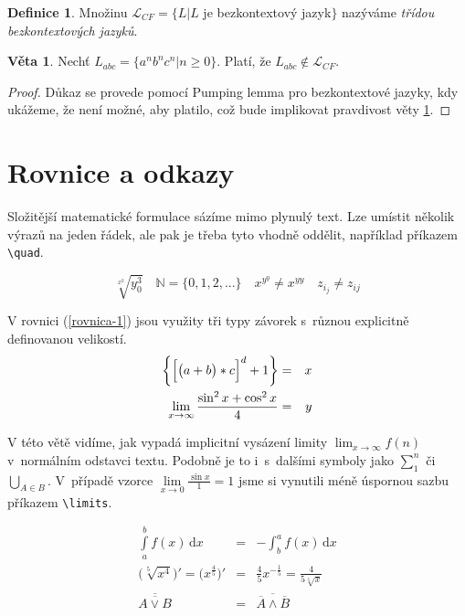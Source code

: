 \documentclass[11pt, a4paper, twocolumn, titlepage] {article}
\theoremstyle{definition}
\newtheorem{definition}{Definice}[section]
\newtheorem{veta}{Věta}
\begin{document}
\begin{definition}
Množinu $\mathcal{L}_{CF} = \{L|L$ je bezkontextový jazyk$\}$ nazýváme \emph{třídou bezkontextových jazyků}.
\end{definition}

\begin{veta} \label{veta-1}
Nechť $L_{abc} = \{ a^nb^nc^n|n \geq 0 \}$. Platí, že $L_{abc} \notin \mathcal{L}_{CF}$.
\end{veta}

\begin{proof}
Důkaz se provede pomocí Pumping lemma pro bezkontextové jazyky, kdy ukážeme, že není možné, aby platilo, což bude implikovat pravdivost věty \ref{veta-1}.
\end{proof}

\section{Rovnice a odkazy}
Složitější matematické formulace sázíme mimo plynulý text. Lze umístit několik výrazů na jeden řádek, ale pak je třeba tyto vhodně oddělit, například příkazem \verb|\quad|.

$$\sqrt[x^2]{y^3_0} \quad \mathbb{N} = \{0,1,2,...\} \quad x^{y^y} \neq x^{yy} \quad z_{i_j} \neq z_{ij}$$

V rovnici (\ref{rovnica-1}) jsou využity tři typy závorek s~různou explicitně definovanou velikostí.
\begin{eqnarray} 
\bigg{\{} \Big[ \big(a + b \big) * c \Big]^d + 1\bigg{\}} &= &x \label{rovnica-1}\\
\lim_{x\to\infty}\frac{\sin^2 x + \cos^2 x}{4}  &= &y \nonumber
\end{eqnarray}

V této větě vidíme, jak vypadá implicitní vysázení limity $\lim_{x\to\infty}f(n)$ v~normálním odstavci textu. Podobně je to i~s~dalšími symboly jako $\sum_{1}^n$ či $\bigcup_{A \in B}$. V~případě vzorce $\lim\limits_{x\to 0}\frac{\sin x}{1} = 1$ jsme si vynutili méně úspornou sazbu příkazem \verb|\limits|.


\begin{eqnarray}
\int\limits_a^b f(x)\,\mathrm{d}x &= &-\int_b^a f(x)\,\mathrm{d}x\\
\Big( \sqrt[5]{x^4} \Big)' = \Big( x^{\frac{4}{5}} \Big)' &= & \frac{4}{5}x^{-\frac{1}{5}} = \frac{4}{5\sqrt[5]{x}}\\
\overline{\overline{A \vee B }} &= &\overline{\overline{A} \wedge \overline{B}} 
\end{eqnarray}
\end{document}

